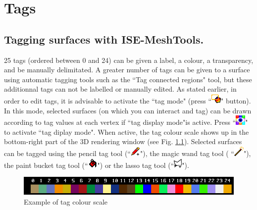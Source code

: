 
\chapter{Tags}\label{tags_chapter}
\minitoc 
\section{Tagging surfaces with ISE-MeshTools.}
25 tags (ordered between 0 and 24) can be given
a label, a colour, a transparency, and be manually
delimitated. A greater number of tags can be given
to a surface using automatic tagging tools such as the ``Tag connected regions" tool, but these
additionnal tags can not be labelled or manually edited. As stated earlier, in order to edit tags, it is advisable to activate the ``tag mode" (press ``\includegraphics[scale=0.7]{images/pixmap/Tag_select_mode.png}" button). In this mode, selected surfaces (on which you can interact and tag) can be drawn according to tag values at each vertex if ``tag display mode"is active. Press ``\includegraphics[scale=0.7]{images/pixmap/Show_Tag_Window.png}" to activate ``tag diplay mode". When active, the tag colour scale shows up in the bottom-right part of the 3D rendering window (see Fig. \ref{tag_colour_scale}). Selected surfaces can be tagged using the pencil tag tool (``\includegraphics[scale=0.7]{images/pixmap/pencil.png}"), the magic wand tag tool ( ``\includegraphics[scale=0.7]{images/pixmap/magic_wand.png}"), the paint bucket tag tool (``\includegraphics[scale=0.7]{images/pixmap/Flood_fill.png}") or the lasso tag tool (``\includegraphics[scale=0.7]{images/pixmap/Lasso_plus.png}").

\begin{figure}
  \centering
  \includegraphics[scale=0.5]{images/Tags/Tag_colour_scale.png} 
	\caption{Example of tag colour scale}
\label{tag_colour_scale}
 
\end{figure}



